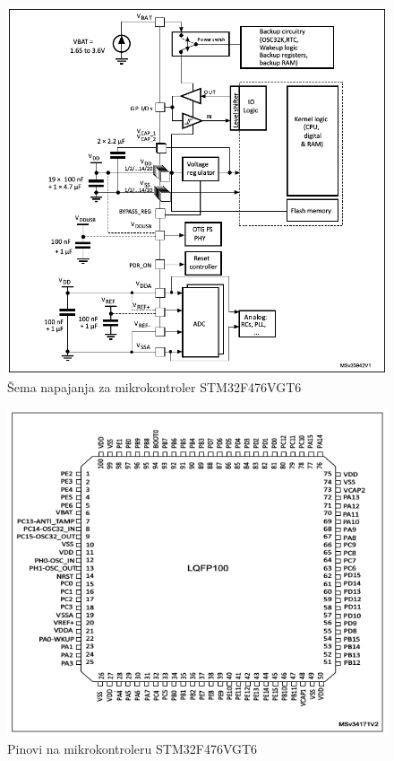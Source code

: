 \documentclass[a4paper, 12pt, oneside, titlepage]{article}
\begin{document}
      \begin{figure}[H]
        \centering
        \includegraphics[width=\textwidth]{slike/blok_napajanje}
        \caption{Šema napajanja za mikrokontroler STM32F476VGT6}
        \label{fig:blok_napajanje} %
      \end{figure}
      
      \begin{figure}[H]
        \centering
        \includegraphics[width=\textwidth]{slike/blok_pinovi}
        \caption{Pinovi na mikrokontroleru STM32F476VGT6}
        \label{fig:blok_pinovi} %
      \end{figure}
    
\end{document}
